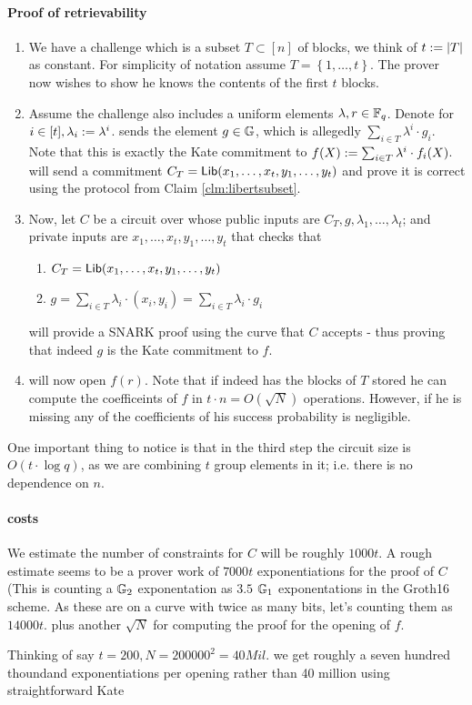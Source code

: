 \documentclass[11pt]{article}
\numberwithin{figure}{section} %
\newcommand{\set}[1]{\ensuremath{\left\{#1\right\}}\xspace}
\begin{document}
\paragraph{Proof of retrievability}
\begin{enumerate}
 \item We have a challenge which is a subset $T\subset [n]$ of blocks, we think of $t:= |T|$ as constant. For simplicity of notation assume $T=\set{1,\ldots,t}$. The prover \prv now wishes to show he knows the contents of the first $t$ blocks.
 \item\label{stp:comb} Assume the challenge also includes a uniform elements $\lambda,r\in{\mathbb F}_q$.
 Denote for $i\in [t], \lambda_i:= \lambda^i$.
 \prv sends the element $g\in {\mathbb G}$, which is allegedly $\sum_{i\in T} \lambda^i\cdot g_i$.
 Note that this is exactly the Kate commitment to $f(X):= \sum_{i\in T} \lambda^i\cdot f_i(X)$.
 \prv will send a commitment $C_T=\mathsf{Lib}(x_1,\ldots,x_t,y_1,\ldots,y_t)$ and prove it is correct using the protocol from Claim \ref{clm:libertsubset}.
 \item Now, let $C$ be a circuit over \Fr whose public inputs are $C_T,g,\lambda_1,\ldots,\lambda_t$; and private inputs are $x_1,\ldots,x_t,$$y_1,\ldots,y_t$ that checks that
 \begin{enumerate}
  \item $C_T=\mathsf{Lib}(x_1,\ldots,x_t,y_1,\ldots,y_t)$
  
  \item $g=\sum_{i\in T} \lambda_i \cdot (x_i,y_i) = \sum_{i\in T} \lambda_i \cdot g_i$ 
 \end{enumerate}
\prv will provide a SNARK proof using the curve \H that $C$ accepts - thus proving that indeed $g$ is the Kate commitment to $f$.
\item \prv  will now open $f(r)$. Note that if \prv indeed has the blocks of $T$ stored he can compute the coefficeints of $f$ in  $t\cdot n = O(\sqrt{N})$ operations. However, if he is missing any of the coefficients of  his success probability is negligible.
\end{enumerate}
 
One important thing to notice is that in the third step the circuit size is $O(t\cdot \log q)$,
as we are combining $t$ group elements in it; i.e. there is no dependence on $n$.
 
 
 \paragraph{costs}
 We estimate the number of constraints for $C$ will be roughly $1000t$.
 A rough estimate seems to be a prover work of $7000t$ exponentiations for the proof of $C$ (This is counting a ${\mathbb G}_2$ exponentation as $3.5$ ${\mathbb G}_1$ exponentations in the Groth16 scheme. 
 As these are on a curve with twice as many bits, let's counting them as $14000t$.
 plus another $\sqrt{N}$ for computing the proof for the opening of $f$.
 
 Thinking of say $t=200, N=200000^2 =40 Mil.$ we get roughly a seven hundred thoundand exponentiations  per opening rather than 40 million using straightforward Kate
 
 

\end{document}
